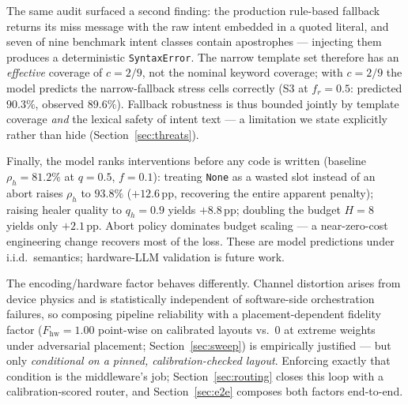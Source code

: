 ﻿\documentclass[12pt,a4paper]{article}
\begin{document}
\begin{table}[H]
\centering
\caption{Reliability composition: measured vs.\ exact structural prediction vs.\ naive independence (S2 pipeline, 450 tasks per row). The v2.0 attribution of the naive--measured gap to correlation is falsified; truncation of the retry budget explains it.}
\label{tab:calculus}
\small
{}
\end{table}

The same audit surfaced a second finding: the production rule-based fallback returns its miss message with the raw intent embedded in a quoted literal, and seven of nine benchmark intent classes contain apostrophes --- injecting them produces a deterministic \texttt{SyntaxError}. The narrow template set therefore has an \emph{effective} coverage of $c = 2/9$, not the nominal keyword coverage; with $c=2/9$ the model predicts the narrow-fallback stress cells correctly (S3 at $f_r{=}0.5$: predicted $90.3\%$, observed $89.6\%$). Fallback robustness is thus bounded jointly by template coverage \emph{and} the lexical safety of intent text --- a limitation we state explicitly rather than hide (Section~\ref{sec:threats}).

Finally, the model ranks interventions before any code is written (baseline $\rho_h = 81.2\%$ at $q{=}0.5$, $f{=}0.1$): treating \texttt{None} as a wasted slot instead of an abort raises $\rho_h$ to $93.8\%$ ($+12.6$\,pp, recovering the entire apparent penalty); raising healer quality to $q_h{=}0.9$ yields $+8.8$\,pp; doubling the budget $H{=}8$ yields only $+2.1$\,pp. Abort policy dominates budget scaling --- a near-zero-cost engineering change recovers most of the loss. These are model predictions under i.i.d.\ semantics; hardware-LLM validation is future work.

The encoding/hardware factor behaves differently. Channel distortion arises from device physics and is statistically independent of software-side orchestration failures, so composing pipeline reliability with a placement-dependent fidelity factor ($F_{\mathrm{hw}} = 1.00$ point-wise on calibrated layouts vs.\ $0$ at extreme weights under adversarial placement; Section~\ref{sec:sweep}) is empirically justified --- but only \emph{conditional on a pinned, calibration-checked layout}. Enforcing exactly that condition is the middleware's job; Section~\ref{sec:routing} closes this loop with a calibration-scored router, and Section~\ref{sec:e2e} composes both factors end-to-end.
\end{document}
